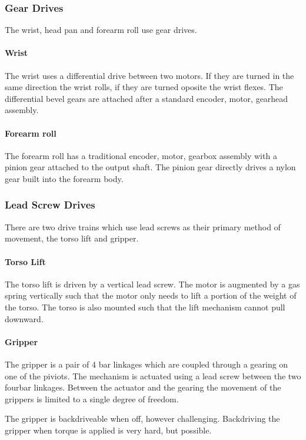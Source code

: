 \subsubsection{Gear Drives}
The wrist, head pan and forearm roll use gear drives.  

\paragraph{Wrist}
The wrist uses a differential drive between two motors.  If they
are turned in the same direction the wrist rolls, if they are turned
oposite the wrist flexes.  The differential bevel gears are attached
after a standard encoder, motor, gearhead assembly.


\paragraph{Forearm roll}
The forearm roll has a traditional encoder, motor, gearbox assembly
with a pinion gear attached to the output shaft.  The pinion gear
directly drives a nylon gear built into the forearm body.

\subsubsection{Lead Screw Drives}
There are two drive trains which use lead screws as their primary
method of movement, the torso lift and gripper.  

\paragraph{Torso Lift}
The torso lift is driven by a vertical lead screw.  The motor is
augmented by a gas spring vertically such that the motor only needs to
lift a portion of the weight of the torso.  The torso is also mounted
such that the lift mechanism cannot pull downward.

\paragraph{Gripper}
The gripper is a pair of 4 bar linkages which are coupled through a
gearing on one of the piviots.  The mechanism is actuated using a lead
screw between the two fourbar linkages. Between the actuator and the
gearing the movement of the grippers is limited to a single degree of
freedom.

The gripper is backdriveable when off, however challenging.
Backdriving the gripper when torque is applied is very hard, but
possible.

